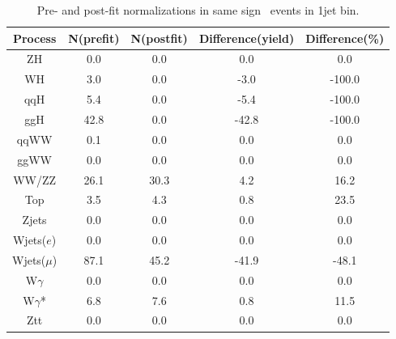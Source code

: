 \begin{table}[ht!]
\begin{center}
\begin{tabular}{c|cc|cc}
\hline
\hline
Process     &    N(prefit) &   N(postfit) & Difference(yield) &  Difference(\%)  \\  
\hline
\hline
ZH          &        0.0 &        0.0 &        0.0 &        0.0        \\
WH          &        3.0 &        0.0 &       -3.0 &     -100.0        \\
qqH         &        5.4 &        0.0 &       -5.4 &     -100.0        \\
ggH         &       42.8 &        0.0 &      -42.8 &     -100.0        \\
\hline
qqWW        &        0.1 &        0.0 &        0.0 &        0.0        \\
ggWW        &        0.0 &        0.0 &        0.0 &        0.0        \\
\hline
WW/ZZ       &       26.1 &       30.3 &        4.2 &       16.2        \\
\hline
Top         &        3.5 &        4.3 &        0.8 &       23.5        \\
\hline
Zjets       &        0.0 &        0.0 &        0.0 &        0.0        \\
\hline
Wjets($e$)  &        0.0 &        0.0 &        0.0 &        0.0        \\
Wjets($\mu$)&       87.1 &       45.2 &      -41.9 &      -48.1        \\
\hline
W$\gamma$   &        0.0 &        0.0 &        0.0 &        0.0        \\
W$\gamma$*  &        6.8 &        7.6 &        0.8 &       11.5        \\
\hline
Ztt         &        0.0 &        0.0 &        0.0 &        0.0        \\
\hline
\hline
\end{tabular}
\caption{Pre- and post-fit normalizations in same sign \M\M~events in 1jet bin. }
\label{tab:fitval_norm_ssmm_1j}
\end{center}
\end{table}


